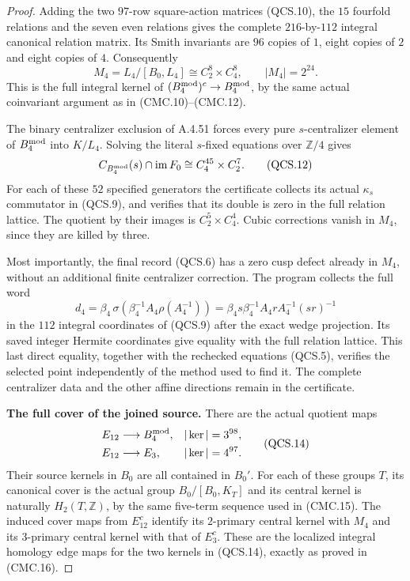 \begin{proof}
Adding the two $97$-row square-action matrices (QCS.10), the $15$
fourfold relations and the seven even relations gives the complete
$216$-by-$112$ integral canonical relation matrix.  Its Smith invariants
are $96$ copies of $1$, eight copies of $2$ and eight copies of $4$.
Consequently
\[
 M_4=L_4/[B_0,L_4]\cong C_2^8\times C_4^8,
                 \qquad |M_4|=2^{24}.
 \tag{QCS.11}
\]
This is the full integral kernel of
$(B_4^{\rm mod})^c\to B_4^{\rm mod}$, by the same actual coinvariant
argument as in (CMC.10)--(CMC.12).

The binary centralizer exclusion of A.4.51 forces every pure
$s$-centralizer element of $B_4^{\rm mod}$ into $K/L_4$.
Solving the literal $s$-fixed equations over $\mathbb Z/4$ gives
\[
 C_{B_4^{\rm mod}}(s)\cap\operatorname{im}F_0
       \cong C_4^{45}\times C_2^7.
 \tag{QCS.12}
\]
For each of these $52$ specified generators the certificate collects
its actual $\kappa_s$ commutator in (QCS.9), and verifies that its
double is zero in the full relation lattice.  The quotient by their
images is $C_2^5\times C_4^4$.  Cubic corrections vanish in $M_4$,
since they are killed by three.

Most importantly, the final record (QCS.6) has a zero cusp defect
already in $M_4$, without an additional finite centralizer correction.
The program  collects the full word
\[
 d_4=\beta_4\,\sigma\!\left(\beta_4^{-1}A_4\rho(A_4^{-1})\right)
     =\beta_4s\beta_4^{-1}A_4rA_4^{-1}(sr)^{-1}
 \tag{QCS.13}
\]
in the $112$ integral coordinates of (QCS.9) after the exact wedge
projection.  Its saved integer Hermite coordinates give equality with
the full relation lattice.  This last direct equality, together with
the rechecked equations (QCS.5), verifies the selected point independently
of the method used to find it.  The complete centralizer data and the
other affine directions remain in the certificate.

\par\medskip\noindent\textbf{The full cover of the joined source.}
There are the actual quotient maps
\[
 \begin{aligned}
 E_{12}&\longrightarrow B_4^{\rm mod},&|\ker|&=3^{98},\\
 E_{12}&\longrightarrow E_3,&|\ker|&=4^{97}.
 \end{aligned}
 \tag{QCS.14}
\]
Their source kernels in $B_0$ are all contained in $B_0'$.
For each of these groups $T$, its canonical cover is the actual group
$B_0/[B_0,K_T]$ and its central kernel is naturally $H_2(T,\mathbb Z)$,
by the same five-term sequence used in (CMC.15).  The induced cover
maps from $E_{12}^c$ identify its $2$-primary central kernel with $M_4$
and its $3$-primary central kernel with that of $E_3^c$.  These are the
localized integral homology edge maps for the two kernels in
(QCS.14), exactly as proved in (CMC.16).


\end{proof}
